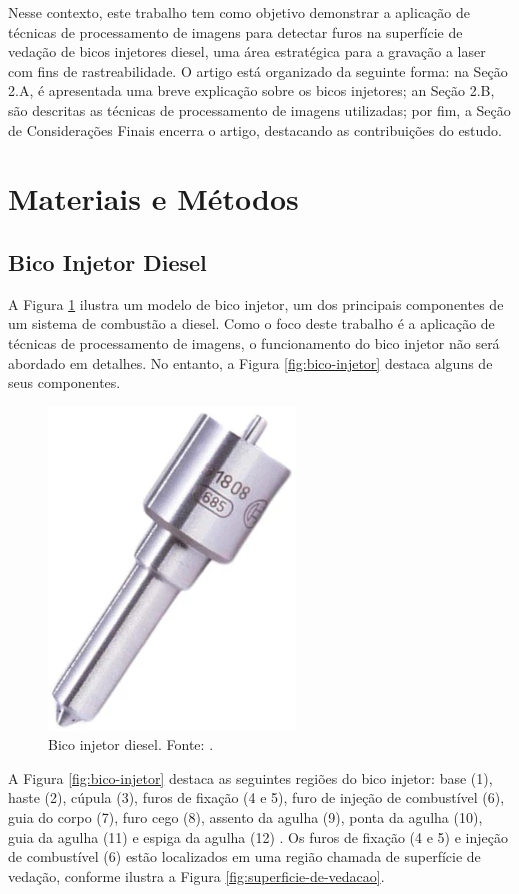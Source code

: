 \documentclass[conference]{IEEEtran}
\begin{document}
Nesse contexto, este trabalho tem como objetivo demonstrar a aplicação de técnicas de processamento de imagens para detectar furos na superfície de vedação de bicos injetores diesel, uma área estratégica para a gravação a laser com fins de rastreabilidade. O artigo está organizado da seguinte forma: na Seção 2.A, é apresentada uma breve explicação sobre os bicos injetores; an Seção 2.B, são descritas as técnicas de processamento de imagens utilizadas; por fim, a Seção de Considerações Finais encerra o artigo, destacando as contribuições do estudo.

\section{Materiais e Métodos}
\subsection{Bico Injetor Diesel}

A Figura \ref{fig:bico-injetor-real} ilustra um modelo de bico injetor, um dos principais componentes de um sistema de combustão a diesel. Como o foco deste trabalho é a aplicação de técnicas de processamento de imagens, o funcionamento do bico injetor não será abordado em detalhes. No entanto, a Figura \ref{fig:bico-injetor} destaca alguns de seus componentes.

\begin{figure}[b]
	\centering
	\includegraphics[scale=0.46]{Images/bico-injetor-real.png}
	\caption{Bico injetor diesel. Fonte: \cite{karhub}.}
	\label{fig:bico-injetor-real}
\end{figure}

A Figura \ref{fig:bico-injetor} destaca as seguintes regiões do bico injetor: base (1), haste (2), cúpula (3), furos de fixação (4 e 5), furo de injeção de combustível (6), guia do corpo (7), furo cego (8), assento da agulha (9), ponta da agulha (10), guia da agulha (11) e espiga da agulha (12) \cite{Girotto2023}. Os furos de fixação (4 e 5) e injeção de combustível (6) estão localizados em uma região chamada de superfície de vedação, conforme ilustra a Figura \ref{fig:superficie-de-vedacao}.
 
\end{document}
